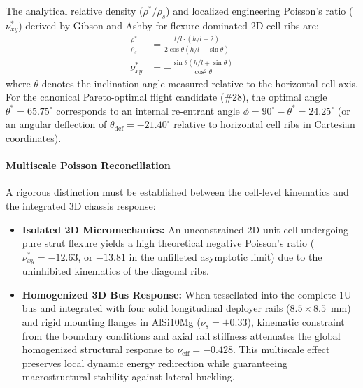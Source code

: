 \documentclass[preprint,12pt,3p]{elsarticle}
\begin{document}
The analytical relative density ($\rho^* / \rho_s$) and localized engineering Poisson's ratio ($\nu_{xy}^*$) derived by Gibson and Ashby \cite{gibson1997} for flexure-dominated 2D cell ribs are:
\begin{align}
  \frac{\rho^*}{\rho_s} &= \frac{t/l \cdot (h/l + 2)}{2 \cos\theta \left( h/l + \sin\theta \right)} \label{eq:rel_density} \\
  \nu_{xy}^* &= -\frac{\sin\theta \left( h/l + \sin\theta \right)}{\cos^2\theta} \label{eq:poisson}
\end{align}
where $\theta$ denotes the inclination angle measured relative to the horizontal cell axis. For the canonical Pareto-optimal flight candidate (\#28), the optimal angle $\theta^* = 65.75^\circ$ corresponds to an internal re-entrant angle $\phi = 90^\circ - \theta^* = 24.25^\circ$ (or an angular deflection of $\theta_{\text{def}} = -21.40^\circ$ relative to horizontal cell ribs in Cartesian coordinates).

\paragraph{Multiscale Poisson Reconciliation}
A rigorous distinction must be established between the cell-level kinematics and the integrated 3D chassis response:
\begin{itemize}
  \item \textbf{Isolated 2D Micromechanics:} An unconstrained 2D unit cell undergoing pure strut flexure yields a high theoretical negative Poisson's ratio ($\nu_{xy}^* = -12.63$, or $-13.81$ in the unfilleted asymptotic limit) due to the uninhibited kinematics of the diagonal ribs.
  \item \textbf{Homogenized 3D Bus Response:} When tessellated into the complete 1U bus and integrated with four solid longitudinal deployer rails ($8.5 \times 8.5$~mm) and rigid mounting flanges in AlSi10Mg ($\nu_s = +0.33$), kinematic constraint from the boundary conditions and axial rail stiffness attenuates the global homogenized structural response to $\nu_{\text{eff}} = -0.428$. This multiscale effect preserves local dynamic energy redirection while guaranteeing macrostructural stability against lateral buckling.
\end{itemize}
\end{document}
